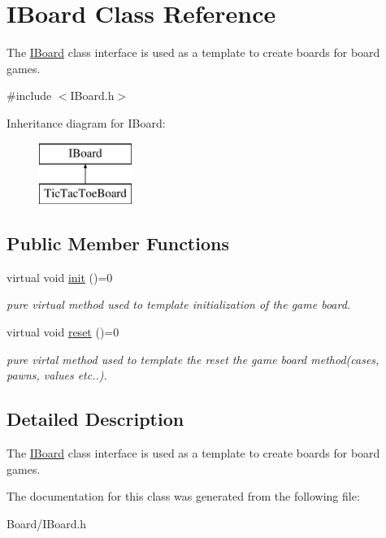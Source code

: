 \hypertarget{class_i_board}{}\section{I\+Board Class Reference}
\label{class_i_board}


The \hyperlink{class_i_board}{I\+Board} class interface is used as a template to create boards for board games.  




{\ttfamily \#include $<$I\+Board.\+h$>$}

Inheritance diagram for I\+Board\+:\begin{figure}[H]
\begin{center}
\leavevmode
\includegraphics[height=2.000000cm]{class_i_board}
\end{center}
\end{figure}
\subsection*{Public Member Functions}
\begin{DoxyCompactItemize}
\item 
\mbox{\label{class_i_board_afb18c7820f9051616ca6f7e6cddad4a8}} 
virtual void \hyperlink{class_i_board_afb18c7820f9051616ca6f7e6cddad4a8}{init} ()=0
\begin{DoxyCompactList}\small\item\em pure virtual method used to template initialization of the game board. \end{DoxyCompactList}\item 
\mbox{\label{class_i_board_acefb3aefbb5e612b2f7eefa52dc04e62}} 
virtual void \hyperlink{class_i_board_acefb3aefbb5e612b2f7eefa52dc04e62}{reset} ()=0
\begin{DoxyCompactList}\small\item\em pure virtal method used to template the reset the game board method(cases, pawns, values etc..). \end{DoxyCompactList}\end{DoxyCompactItemize}


\subsection{Detailed Description}
The \hyperlink{class_i_board}{I\+Board} class interface is used as a template to create boards for board games. 

The documentation for this class was generated from the following file\+:\begin{DoxyCompactItemize}
\item 
Board/I\+Board.\+h\end{DoxyCompactItemize}
